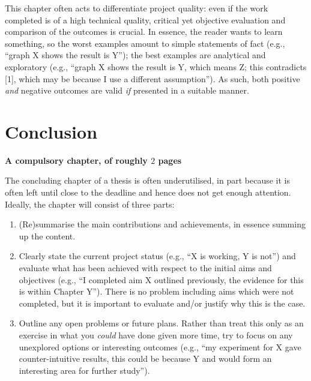 \documentclass[ %
                    author={Luke Murray},
                supervisor={Dr. Simon Hollis},
                     title={Shadow Peer-to-Peer Networks},
                  subtitle={},
                    degree={MEng},
                      year={2013} ]{thesis}
\begin{document}
\noindent
This chapter often acts to differentiate project quality: even if the work
completed is of a high technical quality, critical yet objective evaluation 
and comparison of the outcomes is crucial.  In essence, the reader wants to
learn something, so the worst examples amount to simple statements of fact 
(e.g., ``graph X shows the result is Y''); the best examples are analytical 
and exploratory (e.g., ``graph X shows the result is Y, which means Z; this 
contradicts [1], which may be because I use a different assumption'').  As 
such, both positive {\em and} negative outcomes are valid {\em if} presented 
in a suitable manner.


\chapter{Conclusion}
\label{chap:conclusion}

{\bf A compulsory chapter, of roughly $2$ pages} 
\vspace{1cm} 

\noindent
The concluding chapter of a thesis is often underutilised, in part because
it is often left until close to the deadline and hence does not get enough 
attention.  Ideally, the chapter will consist of three parts:

\begin{enumerate}
\item (Re)summarise the main contributions and achievements, in essence
      summing up the content.
\item Clearly state the current project status (e.g., ``X is working, Y 
      is not'') and evaluate what has been achieved with respect to the 
      initial aims and objectives (e.g., ``I completed aim X outlined 
      previously, the evidence for this is within Chapter Y'').  There 
      is no problem including aims which were not completed, but it is 
      important to evaluate and/or justify why this is the case.
\item Outline any open problems or future plans.  Rather than treat this
      only as an exercise in what you {\em could} have done given more 
      time, try to focus on any unexplored options or interesting outcomes
      (e.g., ``my experiment for X gave counter-intuitive results, this 
      could be because Y and would form an interesting area for further 
      study'').
\end{enumerate}
\end{document}
